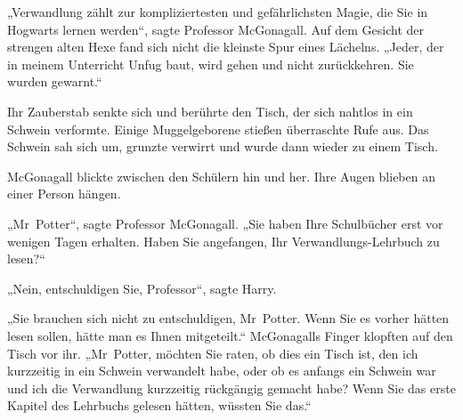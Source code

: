 \later

„Verwandlung zählt zur kompliziertesten und gefährlichsten Magie, die Sie in Hogwarts lernen werden“, sagte Professor McGonagall. Auf dem Gesicht der strengen alten Hexe fand sich nicht die kleinste Spur eines Lächelns. „Jeder, der in meinem Unterricht Unfug baut, wird gehen und nicht zurückkehren. Sie wurden gewarnt.“ 

Ihr Zauberstab senkte sich und berührte den Tisch, der sich nahtlos in ein Schwein verformte. Einige Muggelgeborene stießen überraschte Rufe aus. Das Schwein sah sich um, grunzte verwirrt und wurde dann wieder zu einem Tisch. 

McGonagall blickte zwischen den Schülern hin und her. Ihre Augen blieben an einer Person hängen. 

„Mr~Potter“, sagte Professor McGonagall. „Sie haben Ihre Schulbücher erst vor wenigen Tagen erhalten. Haben Sie angefangen, Ihr Verwandlungs-Lehrbuch zu lesen?“ 

„Nein, entschuldigen Sie, Professor“, sagte Harry. 

„Sie brauchen sich nicht zu entschuldigen, Mr~Potter. Wenn Sie es vorher hätten lesen sollen, hätte man es Ihnen mitgeteilt.“ McGonagalls Finger klopften auf den Tisch vor ihr. „Mr~Potter, möchten Sie raten, ob dies ein Tisch ist, den ich kurzzeitig in ein Schwein verwandelt habe, oder ob es anfangs ein Schwein war und ich die Verwandlung kurzzeitig rückgängig gemacht habe? Wenn Sie das erste Kapitel des Lehrbuchs gelesen hätten, wüssten Sie das.“ 

